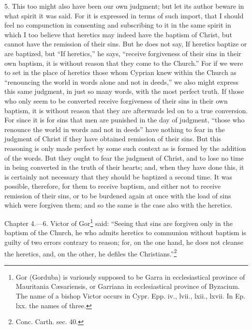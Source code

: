 5. This too might also have been our own judgment; but let its author beware in what spirit it was said. For it is expressed in terms of such import, that I should feel no compunction in consenting and subscribing to it in the same spirit in which I too believe that heretics may indeed have the baptism of Christ, but cannot have the remission of their sins. But he does not say, If heretics baptize or are baptized, but ``If heretics,'' he says, ``receive forgiveness of their sins in their own baptism, it is without reason that they come to the Church.'' For if we were to set in the place of heretics those whom Cyprian knew within the Church as ``renouncing the world in words alone and not in deeds,'' we also might express this same judgment, in just so many words, with the most perfect truth. If those who only seem to be converted receive forgiveness of their sins in their own baptism, it is without reason that they are afterwards led on to a true conversion. For since it is for sins that men are punished in the day of judgment, ``those who renounce the world in words and not in deeds'' have nothing to fear in the judgment of Christ if they have obtained remission of their sins. But this reasoning is only made perfect by some such context as is formed by the addition of the words. But they ought to fear the judgment of Christ, and to lose no time in being converted in the truth of their hearts; and, when they have done this, it is certainly not necessary that they should be baptized a second time. It was possible, therefore, for them to receive baptism, and either not to receive remission of their sins, or to be burdened again at once with the load of sins which were forgiven them; and so the same is the case also with the heretics.


Chapter 4.—6. Victor of Gor\footnote{\par  Gor (Gorduba) is variously supposed to be Garra in ecclesiastical province of Mauritania Cæsariensis, or Garriana in ecclesiastical province of Byzacium. The name of a bishop Victor occurs in Cypr. Epp. iv., lvii., lxii., lxvii. In Ep. lxx. the names of three.} said: ``Seeing that sins are forgiven only in the baptism of the Church, he who admits heretics to communion without baptism is guilty of two errors contrary to reason; for, on the one hand, he does not cleanse the heretics, and, on the other, he defiles the Christians.''\footnote{\par  Conc. Carth. sec. 40.}

